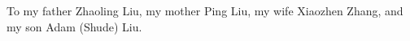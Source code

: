 To my father Zhaoling Liu, my mother Ping Liu, my wife Xiaozhen Zhang, and my son Adam (Shude) Liu.
